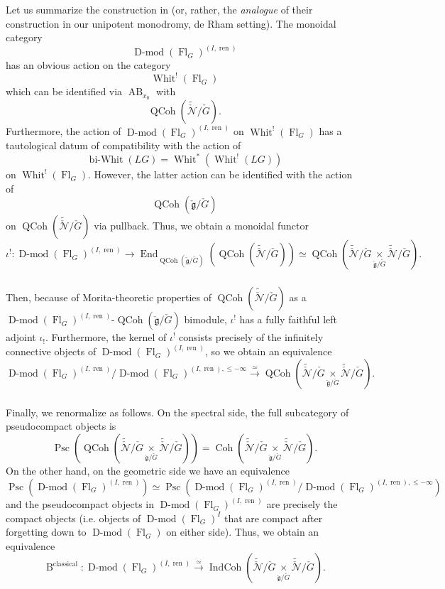 \documentclass[10pt]{amsart}
\theoremstyle{remark}
\newcommand{\on}[1]{\operatorname{#1}}
\newcommand{\Dmod}{\on{D-mod}}
\newcommand{\QCoh}{\on{QCoh}}
\newcommand{\IndCoh}{\on{IndCoh}}
\newcommand{\Gcheck}{\check{G}}
\newcommand{\gcheck}{\check{\mathfrak{g}}}
\newcommand{\sssec}[1]{\subsubsection{}}
\begin{document}
\sssec{}
Let us summarize the construction in \cite{DT} (or, rather, the \emph{analogue} of their construction in our unipotent monodromy, de Rham setting). The monoidal category
$$
\Dmod(\on{Fl}_{G})^{(I, \on{ren})}
$$
has an obvious action on the category
$$
\on{Whit}^!(\on{Fl}_G)
$$
which can be identified via $\on{AB}_{x_0}$ with
$$
\QCoh(\tilde{\check{\mathcal{N}}}/\Gcheck).
$$
Furthermore, the action of $\Dmod(\on{Fl}_{G})^{(I, \on{ren})}$ on $\on{Whit}^!(\on{Fl}_G)$ has a tautological datum of compatibility with the action of
$$
\on{bi-Whit}(LG) = \on{Whit}^*(\on{Whit}^!(LG))
$$
on $\on{Whit}^!(\on{Fl}_G)$. However, the latter action can be identified with the action of
$$
\QCoh(\gcheck/\Gcheck)
$$
on $\QCoh(\tilde{\check{\mathcal{N}}}/\Gcheck)$ via pullback. Thus, we obtain a monoidal functor
$$
\iota^! : \Dmod(\on{Fl}_{G})^{(I, \on{ren})} \longrightarrow \on{End}_{\QCoh(\gcheck/\Gcheck)}(\QCoh(\tilde{\check{\mathcal{N}}}/\Gcheck)) \simeq \QCoh(\tilde{\check{\mathcal{N}}}/\Gcheck \underset{\gcheck/\Gcheck}{\times} \tilde{\check{\mathcal{N}}}/\Gcheck).
$$

\sssec{}
Then, because of Morita-theoretic properties of $\QCoh(\tilde{\check{\mathcal{N}}}/\Gcheck)$ as a $\Dmod(\on{Fl}_{G})^{(I, \on{ren})}$-$\QCoh(\gcheck/\Gcheck)$ bimodule, $\iota^!$ has a fully faithful left adjoint $\iota_!$. Furthermore, the kernel of $\iota^!$ consists precisely of the infinitely connective objects of $\Dmod(\on{Fl}_{G})^{(I, \on{ren})}$, so we obtain an equivalence
$$
\Dmod(\on{Fl}_{G})^{(I, \on{ren})}/\Dmod(\on{Fl}_{G})^{(I, \on{ren}), \leq -\infty} \overset{\simeq}{\longrightarrow} \QCoh(\tilde{\check{\mathcal{N}}}/\Gcheck \underset{\gcheck/\Gcheck}{\times} \tilde{\check{\mathcal{N}}}/\Gcheck).
$$

\sssec{}
Finally, we renormalize as follows. On the spectral side, the full subcategory of pseudocompact objects is
$$
\on{Psc}(\QCoh(\tilde{\check{\mathcal{N}}}/\Gcheck \underset{\gcheck/\Gcheck}{\times} \tilde{\check{\mathcal{N}}}/\Gcheck)) = \on{Coh}(\tilde{\check{\mathcal{N}}}/\Gcheck \underset{\gcheck/\Gcheck}{\times} \tilde{\check{\mathcal{N}}}/\Gcheck).
$$
On the other hand, on the geometric side we have an equivalence
$$
\on{Psc}(\Dmod(\on{Fl}_{G})^{(I, \on{ren})}) \simeq \on{Psc}(\Dmod(\on{Fl}_{G})^{(I, \on{ren})}/\Dmod(\on{Fl}_{G})^{(I, \on{ren}), \leq -\infty})
$$
and the pseudocompact objects in $\Dmod(\on{Fl}_{G})^{(I, \on{ren})}$ are precisely the compact objects (i.e. objects of $\Dmod(\on{Fl}_{G})^{I}$ that are compact after forgetting down to $\Dmod(\on{Fl}_G)$ on either side). Thus, we obtain an equivalence
$$
\on{B}^{\on{classical}} : \Dmod(\on{Fl}_{G})^{(I, \on{ren})} \overset{\simeq}{\longrightarrow} \IndCoh(\tilde{\check{\mathcal{N}}}/\Gcheck \underset{\gcheck/\Gcheck}{\times} \tilde{\check{\mathcal{N}}}/\Gcheck).
$$
\end{document}
